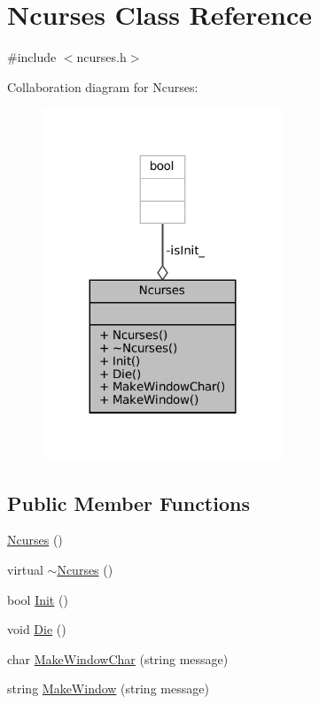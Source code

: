 \hypertarget{classNcurses}{}\section{Ncurses Class Reference}
\label{classNcurses}


{\ttfamily \#include $<$ncurses.\+h$>$}



Collaboration diagram for Ncurses\+:\nopagebreak
\begin{figure}[H]
\begin{center}
\leavevmode
\includegraphics[width=203pt]{classNcurses__coll__graph}
\end{center}
\end{figure}
\subsection*{Public Member Functions}
\begin{DoxyCompactItemize}
\item 
\mbox{\hyperlink{classNcurses_a2565bd187834633fd68b595184ee2acf}{Ncurses}} ()
\item 
virtual \mbox{\hyperlink{classNcurses_a4197da9eb0dafba570c2f60a6ce0124e}{$\sim$\+Ncurses}} ()
\item 
bool \mbox{\hyperlink{classNcurses_a9966b2b23b522e415232976acfa1d18f}{Init}} ()
\item 
void \mbox{\hyperlink{classNcurses_af9467a004e66043d4dbe540e24524f1f}{Die}} ()
\item 
char \mbox{\hyperlink{classNcurses_a2b4916627ad802a840b95cf65766773f}{Make\+Window\+Char}} (string message)
\item 
string \mbox{\hyperlink{classNcurses_a1d8def11419a444c5696b5043da680d4}{Make\+Window}} (string message)
\end{DoxyCompactItemize}
